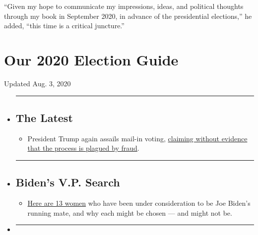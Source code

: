 ``Given my hope to communicate my impressions, ideas, and political
thoughts through my book in September 2020, in advance of the
presidential elections,'' he added, ``this time is a critical
juncture.''

\hypertarget{our-2020-election-guide}{%
\section{Our 2020 Election Guide}\label{our-2020-election-guide}}

Updated Aug. 3, 2020

\begin{itemize}
\item
  \begin{center}\rule{0.5\linewidth}{\linethickness}\end{center}

  \hypertarget{the-latest}{%
  \subsection{The Latest}\label{the-latest}}

  \begin{itemize}
  \tightlist
  \item
    President Trump again assails mail-in voting,
    \href{https://www.nytimes3xbfgragh.onion/2020/08/03/us/politics/trump-mail-in-voting.html?action=click\&pgtype=Article\&state=default\&region=BELOW_MAIN_CONTENT\&context=storylines_guide}{claiming
    without evidence that the process is plagued by fraud}.
  \end{itemize}
\item
  \begin{center}\rule{0.5\linewidth}{\linethickness}\end{center}

  \hypertarget{bidens-vp-search}{%
  \subsection{Biden's V.P. Search}\label{bidens-vp-search}}

  \begin{itemize}
  \tightlist
  \item
    \href{https://www.nytimes3xbfgragh.onion/article/biden-vice-president-2020.html?action=click\&pgtype=Article\&state=default\&region=BELOW_MAIN_CONTENT\&context=storylines_guide}{Here
    are 13 women} who have been under consideration to be Joe Biden's
    running mate, and why each might be chosen --- and might not be.
  \end{itemize}
\item
  \begin{center}\rule{0.5\linewidth}{\linethickness}\end{center}


\end{itemize}
